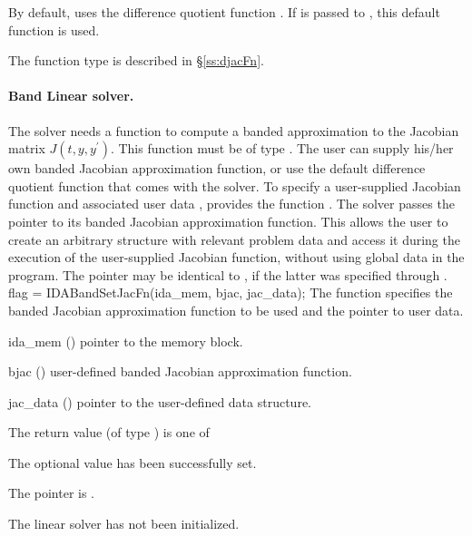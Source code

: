 {
  By default, {\idadense} uses the difference quotient function .
  If  is passed to , this default function is used.

  The function type  is described in \S\ref{ss:djacFn}.
}
\noindent\paragraph{\bf Band Linear solver.}
The 
{\idaband} solver needs a function to compute a banded approximation to
the Jacobian matrix $J(t,y,y^\prime)$.  This function must be of type . 
The user can supply his/her own banded Jacobian approximation function, 
or use the default difference quotient function  
that comes with the {\idaband} solver.
To specify a user-supplied Jacobian function  and associated user 
data , {\idaband} provides the function .
The {\idaband} solver passes the pointer 
to its banded Jacobian approximation function. This allows the user to
create an arbitrary structure with relevant problem data and access it
during the execution of the user-supplied Jacobian function, without
using global data in the program.  The pointer  may be
identical to , if the latter was specified through .
{
  flag = IDABandSetJacFn(ida\_mem, bjac, jac\_data);
}
{
  The function  specifies the banded Jacobian
  approximation function to be used and the pointer to user data.
}
{
  \begin{args}
  \item[ida\_mem] ()
    pointer to the {\ida} memory block.
  \item[bjac] ()
    user-defined banded Jacobian approximation function.
  \item[jac\_data] ()
    pointer to the user-defined data structure.
  \end{args}
}
{
  The return value  (of type ) is one of
  \begin{args}
  \item[\Id{IDABAND\_SUCCESS}] 
    The optional value has been successfully set.
  \item[\Id{IDABAND\_MEM\_NULL}]
    The  pointer is .
  \item[\Id{IDABAND\_LMEM\_NULL}]
    The {\idaband} linear solver has not been initialized.
  \end{args}
}
